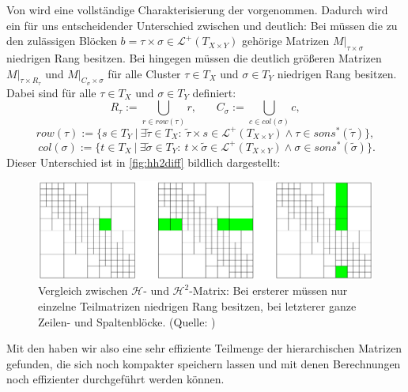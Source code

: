      Von \citet{datasparse} wird eine vollständige Charakterisierung der \hquad vorgenommen. Dadurch wird ein für uns entscheidender Unterschied zwischen \hmat und \hquad deutlich:
      Bei \hmat müssen die zu den zulässigen Blöcken $b =\tau \times \sigma \in \mathcal{L}^+\left(T_{X \times Y}\right)$ gehörige Matrizen $\left. M\right|_{\tau \times \sigma}$ niedrigen Rang besitzen.
      Bei \hquad hingegen müssen die deutlich größeren Matrizen $\left. M\right|_{\tau \times R_\tau}$ und $\left. M\right|_{C_\sigma \times \sigma}$ für alle Cluster $\tau \in T_X$ und $\sigma\in T_Y$
      niedrigen Rang besitzen. Dabei sind für alle $\tau \in T_X$ und $\sigma \in T_Y$ definiert:
      \[
	R_\tau := \bigcup_{r \in row(\tau)} r , \ \ \ \ \ \ \ \ C_\sigma := \bigcup_{c \in col(\sigma)} c,
      \]
      \[
       row(\tau) := \{ s \in T_Y \ | \ \exists \tilde \tau \in T_X \colon \ \tilde \tau \times s \in \mathcal{L}^+\left(T_{X \times Y}\right) \wedge \tau \in sons^*(\tilde \tau) \},
      \]
      \[
       \ col(\sigma) := \{ t \in T_X \ | \ \exists \tilde \sigma \in T_Y \colon \ t \times \tilde \sigma \in \mathcal{L}^+\left(T_{X \times Y}\right) \wedge \sigma \in sons^*(\tilde \sigma) \}.
      \]
      Dieser Unterschied ist in \autoref{fig:hh2diff} bildlich dargestellt:
      
      \begin{figure}[b]
	\includegraphics[width=\textwidth]{img/H_H2_diff.png}
	\caption{Vergleich zwischen $\mathcal{H}$- und $\mathcal{H}^2$-Matrix: Bei ersterer müssen nur einzelne Teilmatrizen niedrigen Rang besitzen, bei letzterer ganze Zeilen- und Spaltenblöcke.
	(Quelle: \citet{nichtlokop})}
	\label{fig:hh2diff}
      \end{figure}


      Mit den \hquad haben wir also eine sehr effiziente Teilmenge der hierarchischen Matrizen gefunden, die sich noch kompakter speichern lassen und mit denen Berechnungen noch effizienter 
      durchgeführt werden können.